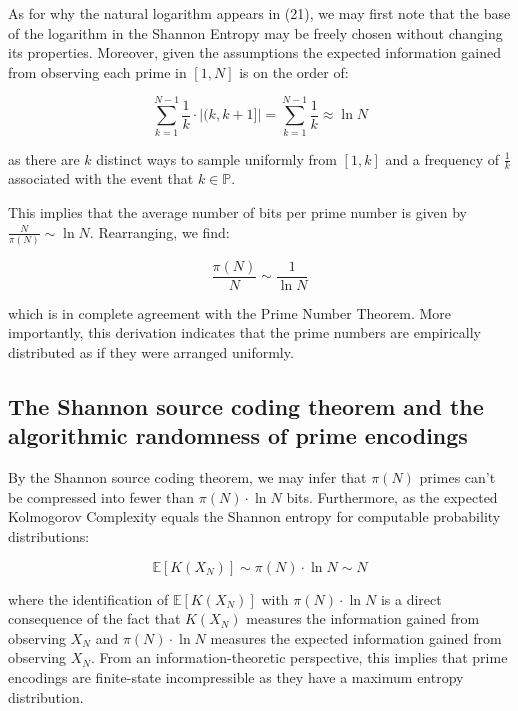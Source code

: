 \documentclass{article}
\begin{document}
As for why the natural logarithm appears in (21), we may first note that the base of the logarithm in the Shannon Entropy may be freely chosen without changing its properties. Moreover, given the assumptions the expected information gained from observing each prime in $[1,N]$ is on the order of: 

\begin{equation}
\sum_{k=1}^{N-1} \frac{1}{k} \cdot |(k,k+1]| = \sum_{k=1}^{N-1} \frac{1}{k} \approx \ln N
\end{equation}

as there are $k$ distinct ways to sample uniformly from $[1,k]$ and a frequency of $\frac{1}{k}$ associated with the event that $k \in \mathbb{P}$. 

This implies that the average number of bits per prime number is given by $\frac{N}{\pi(N)} \sim \ln N$. Rearranging, we find: 

\begin{equation}
\frac{\pi(N)}{N} \sim \frac{1}{\ln N}	
\end{equation}

which is in complete agreement with the Prime Number Theorem. More importantly, this derivation indicates that the prime numbers are empirically distributed as if they were arranged uniformly. 

\subsection{The Shannon source coding theorem and the algorithmic randomness of prime encodings}

By the Shannon source coding theorem, we may infer that $\pi(N)$ primes can't be compressed into fewer than $\pi(N) \cdot \ln N$ bits. Furthermore, as the expected Kolmogorov Complexity equals the Shannon entropy for computable probability distributions: 

\begin{equation}
\mathbb{E}[K(X_N)] \sim 	\pi(N) \cdot \ln N \sim N
\end{equation}

where the identification of $\mathbb{E}[K(X_N)]$ with $\pi(N) \cdot \ln N$ is a direct consequence of the fact that $K(X_N)$ measures the information gained from observing $X_N$ and $\pi(N) \cdot \ln N$ measures the expected information gained from observing $X_N$. From an information-theoretic perspective, this implies that prime encodings are finite-state incompressible as they have a maximum entropy distribution.
\end{document}

